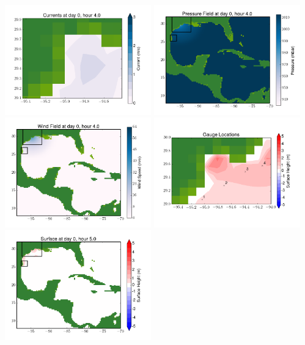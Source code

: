 \documentclass[11pt]{article}
\begin{document}
\vskip 10pt 
\includegraphics[width=0.475\textwidth]{frame0076fig7.png}
\includegraphics[width=0.475\textwidth]{frame0076fig8.png}
\vskip 10pt 
\includegraphics[width=0.475\textwidth]{frame0076fig9.png}
\includegraphics[width=0.475\textwidth]{frame0076fig10.png}
\vskip 10pt 
\includegraphics[width=0.475\textwidth]{frame0077fig1.png}
\end{document}
